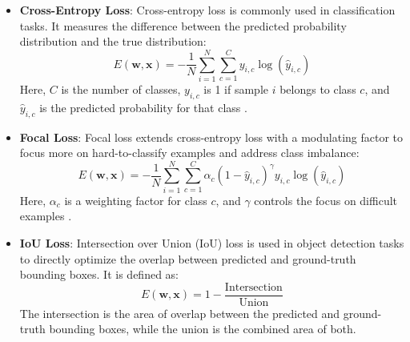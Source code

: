\begin{itemize}
    \item \textbf{Cross-Entropy Loss}:  
    Cross-entropy loss is commonly used in classification tasks. It measures the difference between the predicted probability distribution and the true distribution:
    \begin{equation}
        E(\mathbf{w}, \mathbf{x}) = -\frac{1}{N} \sum_{i=1}^{N} \sum_{c=1}^{C} y_{i,c} \log(\hat{y}_{i,c})
    \end{equation}
    Here, \(C\) is the number of classes, \(y_{i,c}\) is 1 if sample \(i\) belongs to class \(c\), and \(\hat{y}_{i,c}\) is the predicted probability for that class \cite{mao2023crossentropylossfunctionstheoretical}.

    \item \textbf{Focal Loss}:  
    Focal loss extends cross-entropy loss with a modulating factor to focus more on hard-to-classify examples and address class imbalance:
    \begin{equation}
        E(\mathbf{w}, \mathbf{x}) = -\frac{1}{N} \sum_{i=1}^{N} \sum_{c=1}^{C} \alpha_c (1 - \hat{y}_{i,c})^\gamma y_{i,c} \log(\hat{y}_{i,c})
    \end{equation}
    Here, \(\alpha_c\) is a weighting factor for class \(c\), and \(\gamma\) controls the focus on difficult examples \cite{DBLP:journals/corr/abs-1708-02002}.

    \item \textbf{IoU Loss}:  
    Intersection over Union (IoU) loss is used in object detection tasks to directly optimize the overlap between predicted and ground-truth bounding boxes. It is defined as:
    \begin{equation}
        E(\mathbf{w}, \mathbf{x}) = 1 - \frac{\text{Intersection}}{\text{Union}}
    \end{equation}
    The intersection is the area of overlap between the predicted and ground-truth bounding boxes, while the union is the combined area of both.

\end{itemize}

